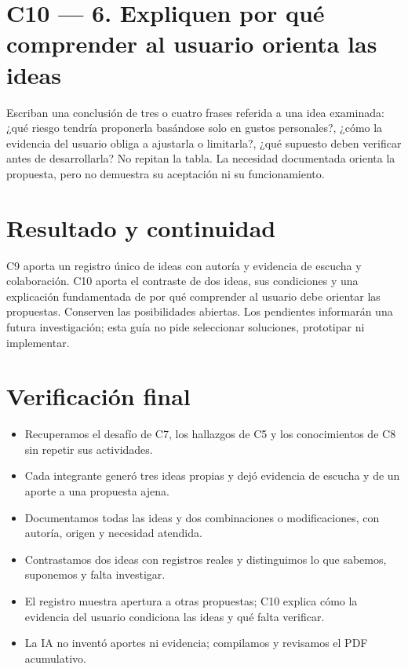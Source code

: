 \documentclass[12pt,a4paper]{article}
\newcommand{\checkbox}{\fbox{\rule{0pt}{0.8ex}\rule{0.8ex}{0pt}}}
\begin{document}
\section*{C10 --- 6. Expliquen por qué comprender al usuario orienta las ideas}
Escriban una conclusión de tres o cuatro frases referida a una idea examinada: ¿qué riesgo tendría proponerla basándose solo en gustos personales?, ¿cómo la evidencia del usuario obliga a ajustarla o limitarla?, ¿qué supuesto deben verificar antes de desarrollarla? No repitan la tabla. La necesidad documentada orienta la propuesta, pero no demuestra su aceptación ni su funcionamiento.

\section*{Resultado y continuidad}
C9 aporta un registro único de ideas con autoría y evidencia de escucha y colaboración. C10 aporta el contraste de dos ideas, sus condiciones y una explicación fundamentada de por qué comprender al usuario debe orientar las propuestas. Conserven las posibilidades abiertas. Los pendientes informarán una futura investigación; esta guía no pide seleccionar soluciones, prototipar ni implementar.
\section*{Verificación final}
{\small
\begin{itemize}[label=\checkbox]
\item Recuperamos el desafío de C7, los hallazgos de C5 y los conocimientos de C8 sin repetir sus actividades.
\item Cada integrante generó tres ideas propias y dejó evidencia de escucha y de un aporte a una propuesta ajena.
\item Documentamos todas las ideas y dos combinaciones o modificaciones, con autoría, origen y necesidad atendida.
\item Contrastamos dos ideas con registros reales y distinguimos lo que sabemos, suponemos y falta investigar.
\item El registro muestra apertura a otras propuestas; C10 explica cómo la evidencia del usuario condiciona las ideas y qué falta verificar.
\item La IA no inventó aportes ni evidencia; compilamos y revisamos el PDF acumulativo.
\end{itemize}
}
\end{document}
